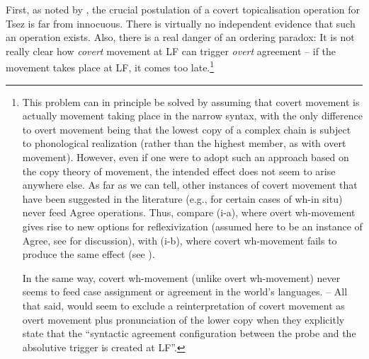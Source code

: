 \documentclass[output=paper
,modfonts
,nonflat]{langsci/langscibook}
\begin{document}

First, as noted by \cite{Boskovic:07}, the crucial postulation of a
covert topicalisation operation for Tsez is far from innocuous. There
is virtually no independent evidence that such an operation
exists. Also, there is a real danger of an ordering paradox: It is not
really clear how {\itshape covert} movement at LF can trigger {\itshape overt}
agreement -- if the movement takes place at LF, it comes too
late.\footnote{This problem  can in principle be solved by assuming
  that covert movement is actually movement taking place in the
  narrow syntax, with the only difference to overt movement being that
  the lowest copy of a complex chain is subject to phonological
  realization (rather than the highest member, as with overt movement).
However, even if one were to adopt such an approach based on the copy
theory of movement, the intended effect does not seem to arise
anywhere else. As far as we can tell, other instances of covert
movement that have been suggested in the literature (e.g., for certain
cases of wh-in situ) never feed Agree operations. Thus, compare (i-a),
where overt wh-movement gives rise to new options for reflexivization
(assumed here to be an instance of Agree, see \cite{Reuland:11} for
discussion), with (i-b), where covert wh-movement fails to produce the
same effect (see \cite{Barss:86}). 

\ea\label{ex:mueller:Fn8}
\z
\z
In the same way, covert wh-movement (unlike overt wh-movement) never seems to feed case
assignment or agreement in the world's languages. -- 
All  that said, \citet[626]{Polinsky&Potsdam:01} would seem to 
exclude a reinterpretation of covert movement as overt movement plus
pronunciation of the lower copy when they explicitly state that the
``syntactic agreement configuration between the probe and the
absolutive trigger is created at LF''.}


\end{document}

